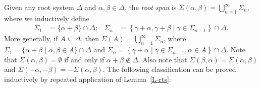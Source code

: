 \documentclass[11pt,letterpaper]{amsart}
\numberwithin{thecounter}{section}
\theoremstyle{definition}
\renewcommand{\a}{\alpha}
\renewcommand{\b}{\beta}
\newcommand{\g}{\gamma}
\newcommand{\N}{{\mathbb N}}
\begin{document}
Given any root system $\Delta$ and $\a,\b\in\Delta$, the \emph{root span} is $\Sigma(\a,\b)=\bigcup_{n=1}^\infty \Sigma_n$, where we inductively define 
\begin{align*}
 \Sigma_1&= \{\a+\b\}\cap\Delta; &
 \Sigma_{n} &= \left\{\g+\a,\g+\b \mid \g\in\Sigma_{n-1} \right\}\cap\Delta.
\end{align*}
More generally, if $A\subseteq\Delta$, then $\Sigma(A)=\bigcup_{n=1}^\infty \Sigma_n$, where 
$\Sigma_1= \{\a+\b\mid \a,\b\in A\}\cap\Delta$ and
$\Sigma_{n} = \left\{\g+\a \mid \g\in\Sigma_{n-1}, \a\in A \right\}\cap\Delta$.
Note that $\Sigma(\a,\b)=\emptyset$ if and only if $\a+\b\notin\Delta$.
Also note that $\Sigma(\b,\a)= \Sigma(\a,\b)$ and $\Sigma(-\a,-\b)=-\Sigma(\a,\b)$.
The following classification can be proved inductively by repeated application of Lemma~\ref{L-rts}:
\end{document}

